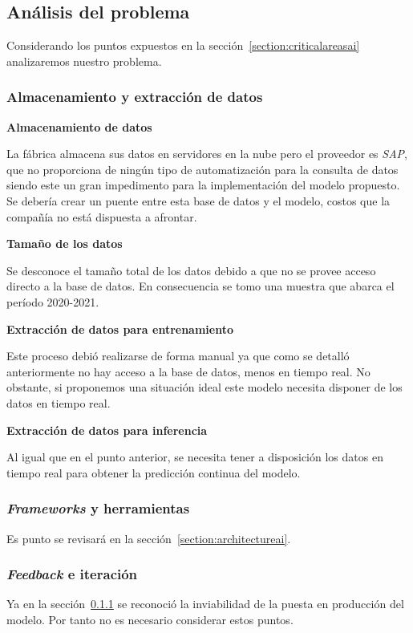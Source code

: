 \documentclass[a4paper,12pt]{article}
\begin{document}
		\subsection{Análisis del problema}\label{problems}
		Considerando los puntos expuestos en la sección~\ref{section:criticalareasai} analizaremos nuestro problema.
		\subsubsection{Almacenamiento y extracción de datos}\label{dataextractfsi}
		\textbf{Almacenamiento de datos}
		
		La fábrica almacena sus datos en servidores en la nube pero el proveedor es \textit{SAP}, que no proporciona de ningún tipo de automatización para la consulta de datos siendo este un gran impedimento para la implementación del modelo propuesto. Se debería crear un puente entre esta base de datos y el modelo, costos que la compañía no está dispuesta a afrontar.
		
		\textbf{Tamaño de los datos}
		
		Se desconoce el tamaño total de los datos debido a que no se provee acceso directo a la base de datos. En consecuencia se tomo una muestra que abarca el período 2020-2021.
		
		\textbf{Extracción de datos para entrenamiento}
		
		Este proceso debió realizarse de forma manual ya que como se detalló anteriormente no hay acceso a la base de datos, menos en tiempo real. No obstante, si proponemos una situación ideal este modelo necesita disponer de los datos en tiempo real.
		
		\textbf{Extracción de datos para inferencia}
		
		Al igual que en el punto anterior, se necesita tener a disposición los datos en tiempo real para obtener la predicción continua del modelo.
		
		\subsubsection{\textit{Frameworks} y herramientas}
		Es punto se revisará en la sección~\ref{section:architectureai}.
		
		\subsubsection{\textit{Feedback} e iteración}
		Ya en la sección~\ref{dataextractfsi} se reconoció la inviabilidad de la puesta en producción del modelo. Por tanto no es necesario considerar estos puntos.
		
\end{document}
